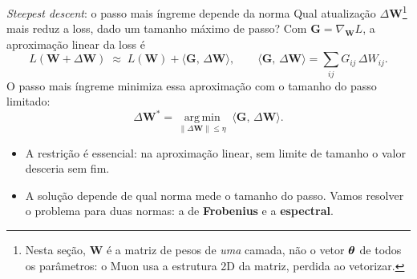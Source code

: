 \documentclass[aspectratio=169,xcolor=dvipsnames]{beamer}
\begin{document}
  \begin{frame}{\textit{Steepest descent}: o passo mais íngreme depende da norma}
    Qual atualização $\Delta \mathbf{W}$\footnote{Nesta seção, $\mathbf{W}$ é a matriz de pesos de
    \emph{uma} camada, não o vetor $\bm{\theta}$ de todos os parâmetros: o Muon usa a estrutura 2D
    da matriz, perdida ao vetorizar.} mais reduz a loss, dado um tamanho máximo de passo?
    Com $\mathbf{G}=\nabla_{\mathbf{W}}L$, a aproximação linear da loss é
    \[
      L(\mathbf{W}+\Delta \mathbf{W})\;\approx\;L(\mathbf{W})+\langle \mathbf{G},\,\Delta \mathbf{W}\rangle,
      \qquad
      \langle \mathbf{G},\,\Delta \mathbf{W}\rangle=\textstyle\sum_{ij}G_{ij}\,\Delta W_{ij}.
    \]
    O passo mais íngreme minimiza essa aproximação com o tamanho do passo limitado:
    \[
      \Delta \mathbf{W}^{*}=\operatorname*{arg\,min}_{\|\Delta \mathbf{W}\|\le \eta}\;\langle \mathbf{G},\,\Delta \mathbf{W}\rangle.
    \]
    \vspace{-0.6\baselineskip}
    \begin{itemize}
      \item A restrição é essencial: na aproximação linear, sem limite de tamanho o valor
        desceria sem fim.
      \item A solução depende de \alert{qual norma} mede o tamanho do passo. Vamos resolver
        o problema para duas normas: a de \textbf{Frobenius} e a \textbf{espectral}.
    \end{itemize}
  \end{frame}
\end{document}
